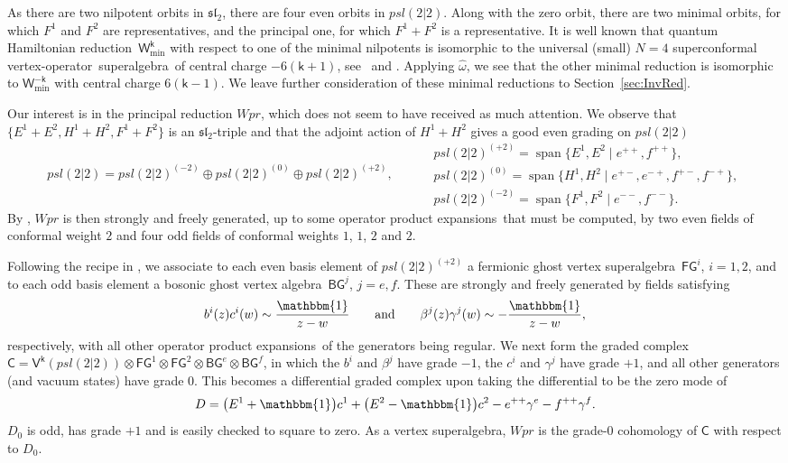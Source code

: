 \documentclass[10pt,a4paper]{amsart}
\numberwithin{equation}{section}
\newcommand{\wun}{\mathbbm{1}} %
\newcommand{\kk}{\mathsf{k}} %
\DeclareMathOperator{\spn}{span}
\newcommand{\alg}[1]{\mathfrak{#1}} %
\newcommand{\VOA}[1]{\mathsf{#1}} %
\newcommand{\affine}[1]{\widehat{#1}}
\newcommand{\SLA}[2]{\alg{#1}_{#2}} %
\newcommand{\SLSA}[3]{\alg{#1}_{#2 \vert #3}} %
\newcommand{\sltwo}{\SLA{sl}{2}}
\newcommand{\psl}{\SLSA{psl}{2}{2}}
\newcommand{\bgsymb}{\VOA{BG}}
\newcommand{\fgsymb}{\VOA{FG}}
\newcommand{\bgvoa}{\bgsymb} %
\newcommand{\fgvoa}{\fgsymb} %
\newcommand{\uaff}[2]{\VOA{V}^{#1}(#2)} %
\newcommand{\upsl}[1][\kk]{\uaff{#1}{\psl}} %
\newcommand{\uwalg}[2]{\VOA{W}^{#1}_{\mathrm{#2}}} %
\newcommand{\upr}[1][\kk]{\uwalg{#1}{pr}} %
\newcommand{\umin}[1][\kk]{\uwalg{#1}{min}} %
\newcommand{\vo}{vertex-operator}
\newcommand{\svoa}{\vo\ superalgebra}
\newcommand{\va}{vertex algebra}
\newcommand{\sva}{vertex superalgebra}
\newcommand{\ope}{operator product expansion}
\newcommand{\opes}{\ope s}
\def\smash#1{#1}
\def\psl{psl(2|2)}
\def\upr{Wpr}
\begin{document}
As there are two nilpotent orbits in $\sltwo$, there are four even orbits in \smash{$\psl$}.
Along with the zero orbit, there are two minimal orbits, for which $F^1$ and $F^2$ are representatives, and the principal one, for which $F^1+F^2$ is a representative.
It is well known that quantum Hamiltonian reduction~$\umin$ with respect to one of the minimal nilpotents is isomorphic to the universal (small) $N=4$ superconformal \svoa\ of central charge $-6(\kk+1)$, see~\cite[Remark~4.1]{KacQua03} and \cite[Section~8.4]{KacQua03b}.
Applying $\affine{\omega}$, we see that the other minimal reduction is isomorphic to $\umin[-\kk]$ with central charge $6(\kk-1)$.
We leave further consideration of these minimal reductions to Section~\ref{sec:InvRed}.

Our interest is in the principal reduction \smash{$\upr$}, which does not seem to have received as much attention.
We observe that $\big\{E^1+E^2,H^1+H^2,F^1+F^2\big\}$ is an $\sltwo$-triple and that the adjoint action of $H^1+H^2$ gives a good even grading on \smash{$\psl$}
\[
		\psl = \psl^{(-2)} \oplus \psl^{(0)} \oplus \psl^{(+2)}, \qquad
	\begin{aligned}
		&\psl^{(+2)} = \spn\bigl\{E^1,E^2 \mid e^{++},f^{++}\bigr\}, \\
		&\psl^{(0)} = \spn\bigl\{H^1,H^2 \mid e^{+-},e^{-+},f^{+-},f^{-+}\bigr\}, \\
		&\psl^{(-2)} = \spn\bigl\{F^1,F^2 \mid e^{--},f^{--}\bigr\}.
	\end{aligned}
\]
By \cite[Theorem~4.1]{KacQua03b}, \smash{$\upr$} is then strongly and freely generated, up to some \opes\ that must be computed, by two even fields of conformal weight $2$ and four odd fields of conformal weights $1$, $1$, $2$ and $2$.

Following the recipe in \cite{KacQua03b}, we associate to each even basis element of \smash{$\psl^{(+2)}$} a fermionic ghost \sva\ $\fgvoa^i$, $i=1,2$, and to each odd basis element a bosonic ghost \va\ $\bgvoa^j$, $j=e,f$.
These are strongly and freely generated by fields satisfying
\[
	b^i(z)c^i(w) \sim \frac{\wun}{z-w} \qquad \text{and} \qquad \beta^j(z)\gamma^j(w) \sim -\frac{\wun}{z-w},
\]
respectively, with all other \opes\ of the generators being regular.
We next form the graded complex
\smash{$\VOA{C} = \upsl \otimes \fgvoa^1 \otimes \fgvoa^2 \otimes \bgvoa^e \otimes \bgvoa^f$},
in which the $b^i$ and $\beta^j$ have grade $-1$, the $c^i$ and $\gamma^j$ have grade $+1$, and all other generators (and vacuum states) have grade $0$.
This becomes a differential graded complex upon taking the differential to be the zero mode of
\[
	D = \big(E^1 + \wun\big) c^1 + \big(E^2 - \wun\big) c^2 - e^{++} \gamma^e - f^{++} \gamma^f.
\]
$D_0$ is odd, has grade $+1$ and is easily checked to square to zero.
As a \sva, \smash{$\upr$} is the grade-$0$ cohomology of $\VOA{C}$ with respect to $D_0$.
\end{document}
